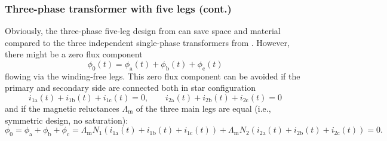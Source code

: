 \begin{frame}
	\frametitle{Three-phase transformer with five legs (cont.)}
	Obviously, the three-phase five-leg design from  can save space and material compared to the three independent single-phase transformers from . However, there might be a zero flux component
	\begin{equation}
		\phi_0(t) = \phi_\mathrm{a}(t) + \phi_\mathrm{b}(t) + \phi_\mathrm{c}(t)  
	\end{equation} 
	flowing via the winding-free legs. This zero flux component can be avoided if the primary and secondary side are connected both in star configuration
	$$ i_{1\mathrm{a}}(t)+i_{1\mathrm{b}}(t)+i_{1\mathrm{c}}(t)=0, \qquad i_{2\mathrm{a}}(t)+i_{2\mathrm{b}}(t)+i_{2\mathrm{c}}(t)=0$$
	and if the magnetic reluctances $\Lambda_\mathrm{m}$ of the three main legs are equal (i.e., symmetric design, no saturation):
	\begin{equation*}
		\phi_0 = \phi_\mathrm{a} + \phi_\mathrm{b} + \phi_\mathrm{c} = \Lambda_\mathrm{m} N_1 \left(i_{1\mathrm{a}}(t)+i_{1\mathrm{b}}(t)+i_{1\mathrm{c}}(t)\right)+\Lambda_\mathrm{m} N_2 \left(i_{2\mathrm{a}}(t)+i_{2\mathrm{b}}(t)+i_{2\mathrm{c}}(t)\right) = 0.
	\end{equation*}
\end{frame}

